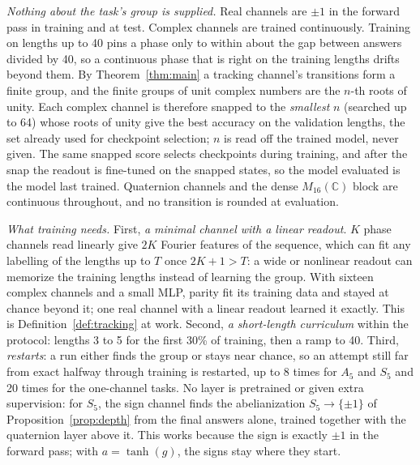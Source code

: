 \documentclass[aps,prx,reprint,superscriptaddress,longbibliography,nofootinbib,floatfix]{revtex4-2}
\newcommand{\CC}{\mathbb{C}}
\theoremstyle{plain}
\theoremstyle{definition}
\begin{document}
\emph{Nothing about the task's group is supplied.} Real channels
are $\pm1$ in the forward pass in training and at test. Complex channels are
trained continuously. Training on lengths up to 40 pins a phase only to
within about the gap between answers divided by 40, so a continuous phase
that is right on the training lengths drifts beyond them. By
Theorem~\ref{thm:main} a tracking channel's transitions form a finite group,
and the finite groups of unit complex numbers are the $n$-th roots of unity.
Each complex channel is therefore snapped to the \emph{smallest} $n$
(searched up to 64) whose roots of unity give the best accuracy on the
validation lengths, the set already used for checkpoint selection; $n$ is
read off the trained model, never given. The same snapped score selects
checkpoints during training, and after the snap the readout is fine-tuned on
the snapped states, so the model evaluated is the model last trained.
Quaternion channels and the dense $M_{16}(\CC)$ block are continuous
throughout, and no transition is rounded at evaluation.

\emph{What training needs.} First, \emph{a minimal channel with a linear
readout}. $K$ phase channels read linearly give $2K$ Fourier features of the
sequence, which can fit any labelling of the lengths up to $T$ once
$2K+1>T$: a wide or nonlinear readout can memorize the training lengths
instead of learning the group. With sixteen complex channels and a small
MLP, parity fit its training data and stayed at chance beyond it; one real
channel with a linear readout learned it exactly. This is
Definition~\ref{def:tracking} at work. Second, \emph{a short-length
curriculum} within the protocol: lengths 3 to 5 for the first 30\% of
training, then a ramp to 40. Third, \emph{restarts}: a run either finds the
group or stays near chance, so an attempt still far from exact halfway
through training is restarted, up to 8 times for $A_5$ and $S_5$ and 20
times for the one-channel tasks.
No layer is pretrained or given extra supervision: for $S_5$, the
sign channel finds the abelianization $S_5\to\{\pm1\}$ of
Proposition~\ref{prop:depth} from the final answers alone, trained together
with the quaternion layer above it. This works because the sign is exactly
$\pm1$ in the forward pass; with $a=\tanh(g)$, the signs stay where they
start.
\end{document}
